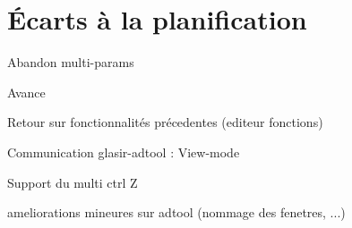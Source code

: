 \section{Écarts à la planification}


Abandon multi-params

Avance

Retour sur fonctionnalités précedentes (editeur fonctions)

Communication glasir-adtool : View-mode

Support du multi ctrl Z

ameliorations mineures sur adtool (nommage des fenetres, ...)
